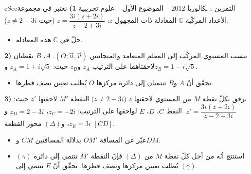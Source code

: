 \documentclass[12pt,a4paper]{article}
\newenvironment{BOX}[2]{\begin{otherlanguage}{english}\begin{arbox}{#1}{#2}}{\end{arbox}\end{otherlanguage}}
\newcounter{exo}
\newenvironment{tamrin}[1]{\stepcounter{exo}\begin{BOX}{cSec}{التمرين \theexo: #1}}{\end{BOX}}
\newenvironment{sq}{\begin{itemize}[leftmargin=2.4em,itemsep=3pt]}{\end{itemize}}
\newcommand{\qa}{\item[(أ)]}\newcommand{\qb}{\item[(ب)]}\newcommand{\qc}{\item[(جـ)]}\newcommand{\qd}{\item[(د)]}\newcommand{\qe}{\item[(هـ)]}
\begin{document}
\begin{tamrin}{بكالوريا 2012 -- الموضوع الأول -- علوم تجريبية}
\textbf{1)} نعتبر في مجموعة الأعداد المركّبة $\mathbb{C}$ المعادلة ذات المجهول $z$:
$z=\dfrac{3i(z+2i)}{z-2+3i}$ (حيث $z\neq2-3i$).
\begin{itemize}
\item حلّ في $\mathbb{C}$ هذه المعادلة.
\end{itemize}
\textbf{2)} ينسب المستوي المركّب إلى المعلم المتعامد والمتجانس $(O;\vec u,\vec v)$. $A$، $B$ نقطتان لاحقتاهما على الترتيب $z_A$ و$z_B$ حيث: $z_A=1+i\sqrt5$ و$z_B=1-i\sqrt5$.
\begin{itemize}
\item تحقّق أنّ $A$ و$B$ تنتميان إلى دائرة مركزها $O$ يُطلب تعيين نصف قطرها.
\end{itemize}
\textbf{3)} نرفق بكلّ نقطة $M$ من المستوي لاحقتها $z$ ($z\neq2-3i$) النقطة $M'$ لاحقتها $z'$ حيث: $z'=\dfrac{3i(z+2i)}{z-2+3i}$.
النقط $C$، $D$، $E$ لواحقها على الترتيب: $z_C=-2i$، $z_D=2-3i$ و$z_E=3i$، و$(\Delta)$ محور القطعة $[CD]$.
\begin{sq}
\qa عبّر عن المسافة $OM'$ بدلالة المسافتين $CM$ و$DM$.
\qb استنتج أنّه من أجل كلّ نقطة $M$ من $(\Delta)$ فإنّ النقطة $M'$ تنتمي إلى دائرة $(\gamma)$ يُطلب تعيين مركزها ونصف قطرها. تحقّق أنّ $E$ تنتمي إلى $(\gamma)$.
\end{sq}
\end{tamrin}
\end{document}
